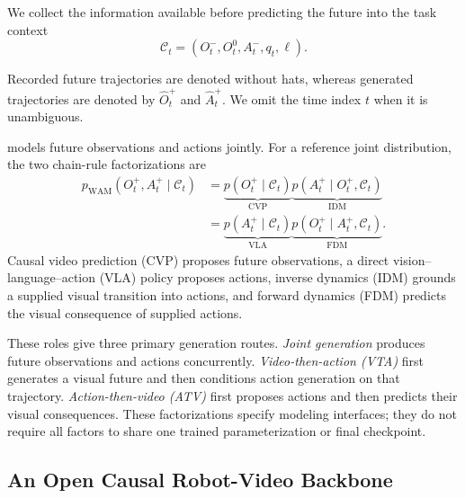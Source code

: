 We collect the information available before predicting the future into the task context
\[
\mathcal C_t=(O_t^-,O_t^0,A_t^-,q_t,\ell).
\]

Recorded future trajectories are denoted without hats, whereas generated trajectories are denoted by \(\hat O_t^+\) and \(\hat A_t^+\). We omit the time index \(t\) when it is unambiguous.

\ours models future observations and actions jointly. For a reference
joint distribution, the two chain-rule factorizations are
\begin{equation}
\begin{aligned}
p_{\mathrm{WAM}}
( O_t^+, A_t^+\mid\mathcal C_t)
&=
\underbrace{p( O_t^+\mid\mathcal C_t)}_{\mathrm{CVP}}
\underbrace{
p( A_t^+\mid O_t^+,\mathcal C_t)
}_{\mathrm{IDM}}\\
&=
\underbrace{p( A_t^+\mid\mathcal C_t)}_{\mathrm{VLA}}
\underbrace{
p( O_t^+\mid A_t^+,\mathcal C_t)
}_{\mathrm{FDM}}.
\end{aligned}
\label{eq:wam-factorizations}
\end{equation}
Causal video prediction (CVP) proposes future observations, a direct
vision--language--action (VLA) policy proposes actions, inverse dynamics
(IDM) grounds a supplied visual transition into actions, and forward
dynamics (FDM) predicts the visual consequence of supplied actions.

These roles give three primary generation routes.
\emph{Joint generation} produces future observations and actions
concurrently. \emph{Video-then-action (VTA)} first generates a visual
future and then conditions action generation on that trajectory.
\emph{Action-then-video (ATV)} first proposes actions and then predicts
their visual consequences. These factorizations specify modeling
interfaces; they do not require all factors to share one trained
parameterization or final checkpoint.




\subsection{An Open Causal Robot-Video Backbone}
\label{sec:causal-video-backbone}


